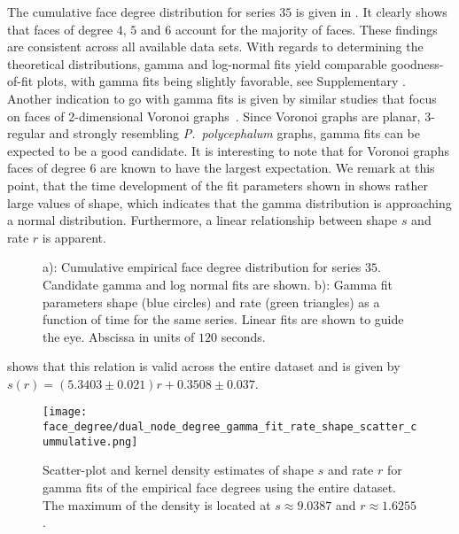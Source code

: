 		The cumulative face degree distribution for series $35$ is given in . It clearly shows that faces of degree $4$, $5$ and $6$ account for the majority of faces. These findings are consistent across all available data sets. With regards to determining the theoretical distributions, gamma and log-normal fits yield comparable goodness-of-fit plots, with gamma fits being slightly favorable, see Supplementary . Another indication to go with gamma fits is given by similar studies that focus on faces of 2-dimensional Voronoi graphs~\cite{hinde1980monte,tanemura2003statistical}. Since Voronoi graphs are planar, $3$-regular and strongly resembling \emph{P.~polycephalum} graphs, gamma fits can be expected to be a good candidate. It is interesting to note that for Voronoi graphs faces of degree $6$ are known to have the largest expectation. We remark at this point, that the time development of the fit parameters shown in  shows rather large values of shape, which indicates that the gamma distribution is approaching a normal distribution. Furthermore, a linear relationship between shape $s$ and rate $r$ is apparent.
 
		\begin{figure}
			\centering

			\caption[Face degree distribution]{a): Cumulative empirical face degree distribution for series $35$. Candidate gamma and log normal fits are shown. b): Gamma fit parameters shape (blue circles) and rate (green triangles) as a function of time for the same series. Linear fits are shown to guide the eye. Abscissa in units of $120$ seconds.}
			\label{fig:face_degree_fit}
		\end{figure}

		 shows that this relation is valid across the entire dataset and is given by $s(r) = (5.3403 \pm 0.021) r + 0.3508 \pm 0.037$.
 
		\begin{figure}[!htbp]
			\centering
				\texttt{[image: face\_degree/dual\_node\_degree\_gamma\_fit\_rate\_shape\_scatter\_cummulative.png]}
			\caption[Face degree distribution fit parameter densities.]{Scatter-plot and kernel density estimates of shape $s$ and rate $r$ for gamma fits of the empirical face degrees using the entire dataset. The maximum of the density is located at $s \approx 9.0387$ and $r \approx 1.6255$.}
			\label{fig:face_degree_kde}
		\end{figure}


